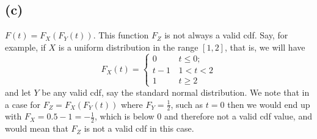 \documentclass{article}
\begin{document}
{\subsection*{(c)}
$F\left(t\right)=F_{X}\left(F_{Y}\left(t\right)\right)$.
This function $F_Z$ is not always a valid cdf. Say, for example, if $X$ is a uniform distribution in the range $[1,2]$, that is, we will have \\ 
\[
F_{X}\left(t\right)=\begin{cases}
0 & \, t \leq 0;\\
t - 1 & \,1 < t < 2\\
1 & \, t \geq 2
\end{cases}
\]
and let $Y$ be any valid cdf, say the standard normal distribution. We note that in a case for $F_Z = F_X(F_Y(t))$ where $F_Y = \frac{1}{2}$, such as $t = 0$ then we would end up with $F_X = 0.5 - 1 = -\frac{1}{2}$, which is below 0 and therefore not a valid cdf value, and would mean that $F_Z$ is not a valid cdf in this case.

}
\end{document}
